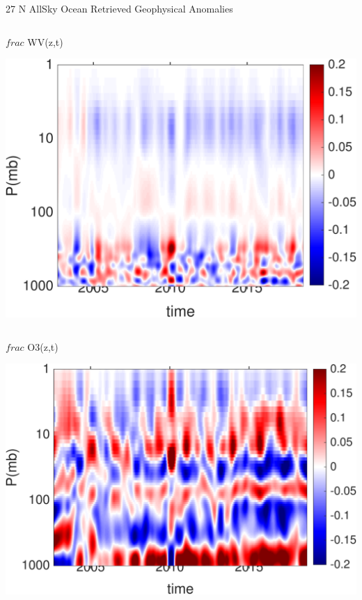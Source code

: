 \documentclass[10pt,t]{beamer}
\begin{document}
\begin{frame}{27 N AllSky Ocean Retrieved Geophysical Anomalies}
\begin{columns}
\begin{column}{0.45\columnwidth}
\begin{block}{\footnotesize $frac$ WV(z,t)}
\vspace{-0.1in}
\begin{center}
\includegraphics[width=\linewidth]{Figs/CloudAnom/Desc_ocean/ntropic27N_umbc_cld_retr_obs_wv_anom_200209_201808.png}
\end{center}
\end{block}
\end{column}
\end{columns}

\vspace{-0.25in}

\begin{columns}
\begin{column}{0.45\columnwidth}
\begin{block}{\footnotesize $frac$ O3(z,t)}
\vspace{-0.1in}
\begin{center}
\includegraphics[width=\linewidth]{Figs/CloudAnom/Desc_ocean/ntropic27N_umbc_cld_retr_obs_o3_anom_200209_201808.png}
\end{center}
\end{block}
\end{column}


\end{columns}
\end{frame}
\end{document}
